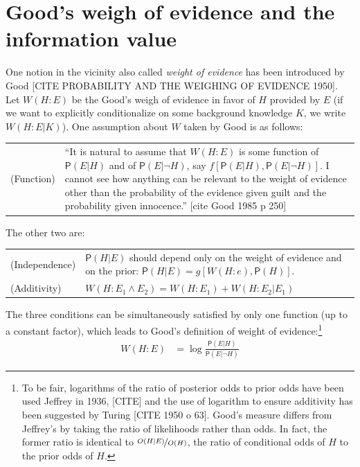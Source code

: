\documentclass[
  10pt,
  dvipsnames,enabledeprecatedfontcommands]{scrartcl}
\newcommand{\pr}[1]{\mathsf{P}(#1)}
\begin{document}
\hypertarget{goods-weigh-of-evidence-and-the-information-value}{%
\section{Good's weigh of evidence and the information
value}\label{goods-weigh-of-evidence-and-the-information-value}}

One notion in the vicinity also called \emph{weight of evidence} has
been introduced by Good {[}CITE PROBABILITY AND THE WEIGHING OF EVIDENCE
1950{]}. Let \(W(H:E)\) be the Good's weigh of evidence in favor of
\(H\) provided by \(E\) (if we want to explicitly conditionalize on some
background knowledge \(K\), we write \(W(H:E\vert K)\)). One assumption
about \(W\) taken by Good is as
follows:

\begin{tabular}{lp{11cm}}
(Function) & ``It is natural to assume that $W(H:E)$ is some function of $\pr{E\vert H}$ and of $\pr{E\vert \neg H}$, say $f[\pr{E\vert H}, \pr{E \vert \neg H}]$. I cannot see how anything can be relevant to the weight of evidence other than the probability of the evidence given guilt and the probability given innocence.'' [cite Good 1985 p 250]
\end{tabular}

The other two are:

\begin{tabular}{lp{11cm}}
(Independence) & $\pr{H\vert E} $ should depend only on the weight of evidence and on the prior: $\pr{H \vert E} = g[W(H:e), \pr{H}]$.\\
(Additivity)  & $W(H: E_1 \wedge E_2)  = W(H:E_1) + W(H:E_2 \vert E_1)$
\end{tabular}

\noindent The three conditions can be simultaneously satisfied by only
one function (up to a constant factor), which leads to Good's definition
of weight of evidence:\footnote{To be fair, logarithms of the ratio of
  posterior odds to prior odds have been used Jeffrey in 1936,
  {[}CITE{]} and the use of logarithm to ensure additivity has been
  suggested by Turing {[}CITE 1950 o 63{]}. Good's measure differs from
  Jeffrey's by taking the ratio of likelihoods rather than odds. In
  fact, the former ratio is identical to
  \(\nicefrac{O(H\vert E)}{O(H)}\), the ratio of conditional odds of
  \(H\) to the prior odds of \(H\).} \begin{align*}
W(H:E) & = \log \frac{\pr{E \vert H}}{\pr{E\vert \neg H}}
\end{align*}
\end{document}
